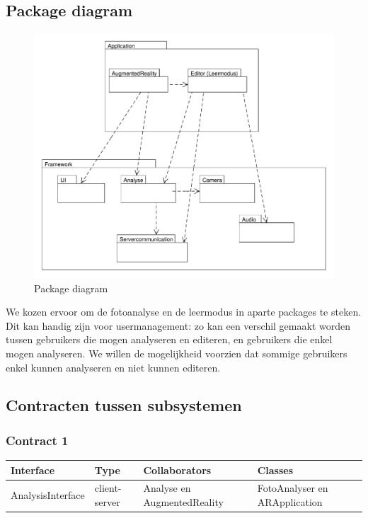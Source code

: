 \documentclass[12pt,a4paper,oneside]{article}
\begin{document}
\subsection{Package diagram}
\begin{figure}[H]
  \begin{center}
    \includegraphics[width=\textwidth]{package_diagram.pdf}
    \caption{Package diagram}
    \label{graph:graph1}
  \end{center}
\end{figure}
We kozen ervoor om de fotoanalyse en de leermodus in aparte packages te steken. Dit kan handig zijn voor usermanagement: zo kan een verschil gemaakt worden tussen gebruikers die mogen analyseren en editeren, en gebruikers die enkel mogen analyseren. We willen de mogelijkheid voorzien dat sommige gebruikers enkel kunnen analyseren en niet kunnen editeren.
\subsection{Contracten tussen subsystemen}
\subsubsection*{Contract 1}
\begin{longtable}{|l|l|p{4cm}|p{5.5cm}|}
\hline\rowcolor{Gray}
\textbf{Interface} & \textbf{Type}& \textbf{Collaborators} & \textbf{Classes}\\ 
\hline
AnalysisInterface&client-server&Analyse en AugmentedReality & FotoAnalyser en ARApplication \\
\hline
\end{longtable}
\end{document}
